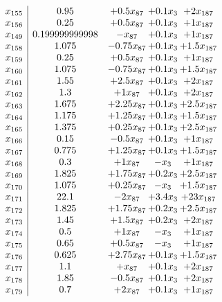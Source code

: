 \documentclass[11pt]{article}
\begin{document}
\[\begin{array}{c| c c@{\hskip 2pt} c@{\hskip 2pt} c@{\hskip 2pt} }
 x_{155}   &  0.95 & + 0.5 x_{87} & + 0.1 x_{3} & + 2 x_{187}\\
 x_{156}   &  0.25 & + 0.5 x_{87} & + 0.1 x_{3} & + 1 x_{187}\\
 x_{149}   &  0.199999999998 & - x_{87} & + 0.1 x_{3} & + 1 x_{187}\\
 x_{158}   &  1.075 & -0.75 x_{87} & + 0.1 x_{3} & + 1.5 x_{187}\\
 x_{159}   &  0.25 & + 0.5 x_{87} & + 0.1 x_{3} & + 1 x_{187}\\
 x_{160}   &  1.075 & -0.75 x_{87} & + 0.1 x_{3} & + 1.5 x_{187}\\
 x_{161}   &  1.55 & + 2.5 x_{87} & + 0.1 x_{3} & + 2 x_{187}\\
 x_{162}   &  1.3 & + 1 x_{87} & + 0.1 x_{3} & + 2 x_{187}\\
 x_{163}   &  1.675 & + 2.25 x_{87} & + 0.1 x_{3} & + 2.5 x_{187}\\
 x_{164}   &  1.175 & + 1.25 x_{87} & + 0.1 x_{3} & + 1.5 x_{187}\\
 x_{165}   &  1.375 & + 0.25 x_{87} & + 0.1 x_{3} & + 2.5 x_{187}\\
 x_{166}   &  0.15 & -0.5 x_{87} & + 0.1 x_{3} & + 1 x_{187}\\
 x_{167}   &  0.775 & + 1.25 x_{87} & + 0.1 x_{3} & + 1.5 x_{187}\\
 x_{168}   &  0.3 & + 1 x_{87} & - x_{3} & + 1 x_{187}\\
 x_{169}   &  1.825 & + 1.75 x_{87} & + 0.2 x_{3} & + 2.5 x_{187}\\
 x_{170}   &  1.075 & + 0.25 x_{87} & - x_{3} & + 1.5 x_{187}\\
 x_{171}   &  22.1 & -2 x_{87} & + 3.4 x_{3} & + 23 x_{187}\\
 x_{172}   &  1.825 & + 1.75 x_{87} & + 0.2 x_{3} & + 2.5 x_{187}\\
 x_{173}   &  1.45 & + 1.5 x_{87} & + 0.2 x_{3} & + 2 x_{187}\\
 x_{174}   &  0.5 & + 1 x_{87} & - x_{3} & + 1 x_{187}\\
 x_{175}   &  0.65 & + 0.5 x_{87} & - x_{3} & + 1 x_{187}\\
 x_{176}   &  0.625 & + 2.75 x_{87} & + 0.1 x_{3} & + 1.5 x_{187}\\
 x_{177}   &  1.1 & +  x_{87} & + 0.1 x_{3} & + 2 x_{187}\\
 x_{178}   &  1.85 & -0.5 x_{87} & + 0.1 x_{3} & + 2 x_{187}\\
 x_{179}   &  0.7 & + 2 x_{87} & + 0.1 x_{3} & + 1 x_{187}\\

\end{array}\]
\end{document}
